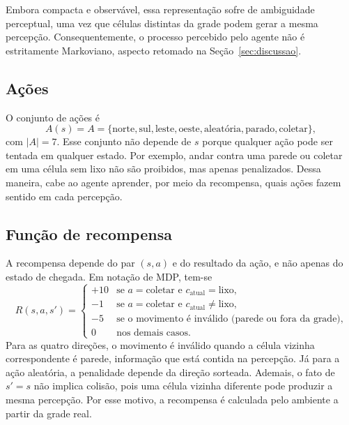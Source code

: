 Embora compacta e observável, essa representação sofre de ambiguidade perceptual, uma vez que células distintas da grade podem gerar a mesma percepção. Consequentemente, o processo percebido pelo agente não é estritamente Markoviano, aspecto retomado na Seção~\ref{sec:discussao}.

\subsection{Ações}

O conjunto de ações é
\begin{equation}
    A(s) = A = \{\text{norte}, \text{sul}, \text{leste}, \text{oeste}, \text{aleatória}, \text{parado}, \text{coletar}\},
\end{equation}
com $|A| = 7$. Esse conjunto não depende de $s$ porque qualquer ação pode ser tentada em qualquer estado. Por exemplo, andar contra uma parede ou coletar em uma célula sem lixo não são proibidos, mas apenas penalizados. Dessa maneira, cabe ao agente aprender, por meio da recompensa, quais ações fazem sentido em cada percepção.

\subsection{Função de recompensa}

A recompensa depende do par $(s, a)$ e do resultado da ação, e não apenas do estado de chegada. Em notação de MDP, tem-se
\begin{equation}
    R(s, a, s') =
    \begin{cases}
        +10 & \text{se } a = \text{coletar e } c_{\text{atual}} = \text{lixo}, \\
        -1  & \text{se } a = \text{coletar e } c_{\text{atual}} \neq \text{lixo}, \\
        -5  & \text{se o movimento é inválido (parede ou fora da grade)}, \\
        0   & \text{nos demais casos.}
    \end{cases}
    \label{eq:recompensa}
\end{equation}
Para as quatro direções, o movimento é inválido quando a célula vizinha correspondente é parede, informação que está contida na percepção. Já para a ação aleatória, a penalidade depende da direção sorteada. Ademais, o fato de $s' = s$ não implica colisão, pois uma célula vizinha diferente pode produzir a mesma percepção. Por esse motivo, a recompensa é calculada pelo ambiente a partir da grade real.

